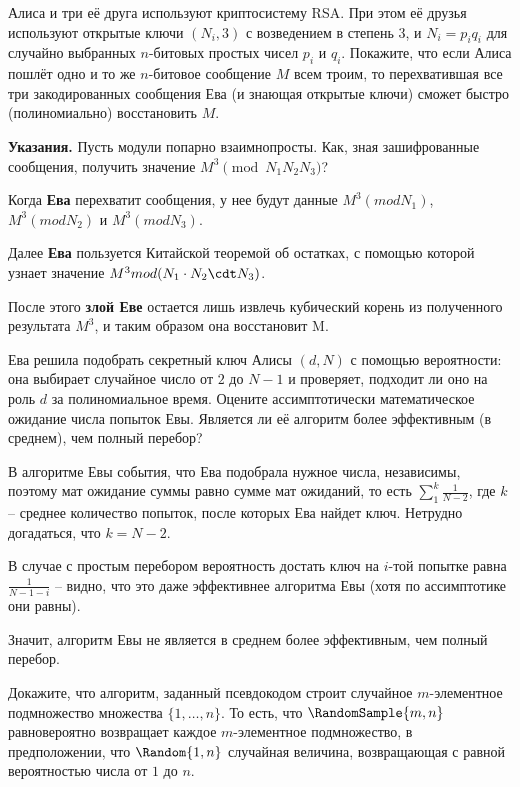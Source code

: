 \documentclass[12pt]{extreport}
\theoremstyle{definiton}
\theoremstyle{definition}
\theoremstyle{definition}
\newcounter{problem}
\newcounter{subproblem}
\def\beforPRskip{
	\bigskip
}
\def\pr{\beforPRskip\noindent\stepcounter{problem}{\bf \theproblem .\;}\setcounter{subproblem}{0}}
\def\prend{
	\bigskip
}
\begin{document}
\pr Алиса и три её друга используют криптосистему RSA. При этом её друзья используют открытые ключи $(N_i , 3)$ с возведением в степень $3$, и $N_i = p_iq_i$ для случайно выбранных $n$-битовых простых чисел $p_i$ и $q_i$. Покажите, что если Алиса пошлёт одно и то же $n$-битовое сообщение $M$ всем троим, то перехватившая все три закодированных сообщения Ева (и знающая открытые ключи) сможет быстро (полиномиально) восстановить $M$. 

\noindent\textbf{Указания.} Пусть модули попарно взаимнопросты. Как, зная зашифрованные сообщения,  получить значение $M^3 \pmod{N_1N_2N_3}$?

\prend

Когда \textbf{Ева} перехватит сообщения, у нее будут данные $M^3 (mod N_1)$, $M^3 (mod N_2)$ и $M^3 (mod N_3)$.

Далее \textbf{Ева} пользуется Китайской теоремой об остатках, с помощью которой узнает значение $M^3 mod(N_1 \cdot N_2 \cdt N_3)$.

После этого \textbf{злой Еве} остается лишь извлечь кубический корень из полученного результата $M^3$, и таким образом она восстановит M.

\pr Ева решила подобрать секретный ключ Алисы $(d, N)$ с помощью вероятности: она выбирает случайное число от $2$ до $N-1$ и проверяет, подходит ли оно на роль $d$ за полиномиальное время. Оцените ассимптотически математическое ожидание числа попыток Евы. Является ли её алгоритм более эффективным (в среднем), чем полный перебор?

	В алгоритме Евы события, что Ева подобрала нужное числа, независимы, поэтому мат ожидание суммы равно сумме мат ожиданий, то есть $\sum_{1}^{k} \frac{1}{N-2}$, где $k$ -- среднее количество попыток, после которых Ева найдет ключ. Нетрудно догадаться, что $k = N - 2$.

	В случае с простым перебором вероятность достать ключ на $i$-той попытке равна $\frac{1}{N-1-i}$ -- видно, что это даже эффективнее алгоритма Евы (хотя по ассимптотике они равны).

	Значит, алгоритм Евы не является в среднем более эффективным, чем полный перебор.



\pr Докажите, что алгоритм, заданный псевдокодом строит случайное $m$-элементное подмножество множества $\{1,\ldots, n\}$. То есть, что $\RandomSample{m, n}$ равновероятно возвращает каждое $m$-элементное подмножество, в предположении, что $\Random{1,n}$ случайная величина, возвращающая с равной вероятностью числа от $1$ до $n$.
\end{document}
